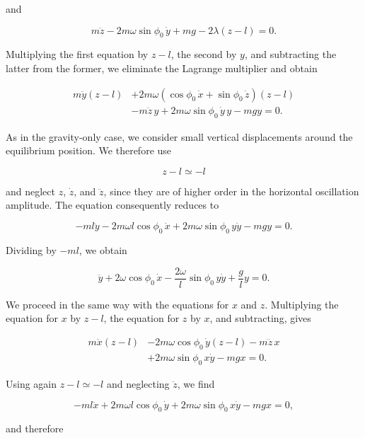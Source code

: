 \documentclass[12pt]{article}
\begin{document}
and

\[
  m\ddot{z}
  -
  2m\omega\sin\phi_0\,\dot{y}
  +
  mg
  -
  2\lambda(z-l)
  =
  0.
\]

Multiplying the first equation by \(z-l\), the second by \(y\), and
subtracting the latter from the former, we eliminate the Lagrange multiplier
and obtain

\[
  \begin{aligned}
    m\ddot{y}(z-l)
    &+
    2m\omega
    \left(
      \cos\phi_0\,\dot{x}
      +
      \sin\phi_0\,\dot{z}
    \right)(z-l)
    \\
    &-
    m\ddot{z}\,y
    +
    2m\omega\sin\phi_0\,\dot{y}\,y
    -
    mgy
    =
    0.
  \end{aligned}
\]

As in the gravity-only case, we consider small vertical displacements around
the equilibrium position. We therefore use

\[
  z-l\simeq-l
\]

and neglect \(z\), \(\dot z\), and \(\ddot z\), since they are of higher
order in the horizontal oscillation amplitude. The equation consequently
reduces to

\[
  -ml\ddot{y}
  -
  2m\omega l\cos\phi_0\,\dot{x}
  +
  2m\omega\sin\phi_0\,y\dot{y}
  -
  mgy
  =
  0.
\]

Dividing by \(-ml\), we obtain

\begin{equation}
  \ddot{y}
  +
  2\omega\cos\phi_0\,\dot{x}
  -
  \frac{2\omega}{l}\sin\phi_0\,y\dot{y}
  +
  \frac{g}{l}y
  =
  0.
  \label{eq:foucault-y-partially-linearized}
\end{equation}

We proceed in the same way with the equations for \(x\) and \(z\).
Multiplying the equation for \(x\) by \(z-l\), the equation for \(z\) by
\(x\), and subtracting, gives

\[
  \begin{aligned}
    m\ddot{x}(z-l)
    &-
    2m\omega\cos\phi_0\,\dot{y}(z-l)
    -
    m\ddot{z}\,x
    \\
    &+
    2m\omega\sin\phi_0\,x\dot{y}
    -
    mgx
    =
    0.
  \end{aligned}
\]

Using again \(z-l\simeq-l\) and neglecting \(\ddot z\), we find

\[
  -ml\ddot{x}
  +
  2m\omega l\cos\phi_0\,\dot{y}
  +
  2m\omega\sin\phi_0\,x\dot{y}
  -
  mgx
  =
  0,
\]

and therefore
\end{document}
